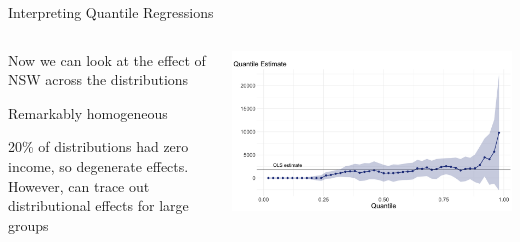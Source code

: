 \documentclass[notes,11pt, aspectratio=169]{beamer}
\newenvironment{wideitemize}{\itemize\addtolength{\itemsep}{10pt}}{\enditemize}
\begin{document}
\begin{frame}{Interpreting Quantile Regressions}
  \begin{columns}[T] %
    \begin{column}{.5\textwidth}
      \begin{wideitemize}
      \item Now we can look at the effect of NSW across the distributions
      \item Remarkably homogeneous
      \item 20\% of distributions had zero income, so degenerate
        effects. However, can trace out distributional effects for
        large groups
      \end{wideitemize}
    \end{column}%
    \hfill%
    \begin{column}{.5\textwidth}
      \includegraphics[width=\linewidth]{quantile_plot_nsw.png}
    \end{column}
  \end{columns}
\end{frame}
\end{document}

